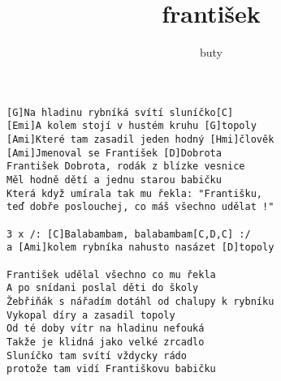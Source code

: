 \author{buty}
\title{františek}
\maketitle
\begin{verbatim}
[G]Na hladinu rybníká svítí sluníčko[C]
[Emi]A kolem stojí v hustém kruhu [G]topoly 
[Ami]Které tam zasadil jeden hodný [Hmi]člověk
[Ami]Jmenoval se František [D]Dobrota
František Dobrota, rodák z blízke vesnice
Měl hodně dětí a jednu starou babičku
Která když umírala tak mu řekla: "Františku,
teď dobře poslouchej, co máš všechno udělat !"

3 x /: [C]Balabambam, balabambam[C,D,C] :/
a [Ami]kolem rybníka nahusto nasázet [D]topoly 

František udělal všechno co mu řekla
A po snídani poslal děti do školy
Žebřiňák s nářadím dotáhl od chalupy k rybníku
Vykopal díry a zasadil topoly
Od té doby vítr na hladinu nefouká
Takže je klidná jako velké zrcadlo
Sluníčko tam svítí vždycky rádo
protože tam vidí Františkovu babičku
\end{verbatim}
